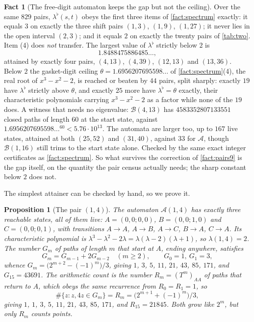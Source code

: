 \documentclass[11pt]{amsart}
\newtheorem{proposition}[theorem]{Proposition}
\theoremstyle{definition}
\newtheorem{fact}[theorem]{Fact}
\theoremstyle{remark}
\begin{document}
\begin{fact}[The free-digit automaton keeps the gap but not the ceiling]
\label{fact:freespectrum}
Over the same $829$ pairs, $\lambda^\flat(s,t)$ obeys the first three items of \cref{fact:spectrum} exactly: it equals $3$ on exactly the three shift pairs $(1,3)$, $(1,9)$, $(1,27)$; it never lies in the open interval $(2,3)$; and it equals $2$ on exactly the twenty pairs of \cref{tab:two}. Item (4) does \emph{not} transfer. The largest value of $\lambda^\flat$ strictly below $2$ is
\[
1.8488475886485\ldots ,
\]
attained by exactly four pairs, $(4,13)$, $(4,39)$, $(12,13)$ and $(13,36)$. Below $2$ the gasket-digit ceiling $\theta=1.6956207695598\ldots$ of \cref{fact:spectrum}(4), the real root of $x^3-x^2-2$, is reached or beaten by $44$ pairs, split sharply: exactly $19$ have $\lambda^\flat$ strictly above $\theta$, and exactly $25$ more have $\lambda^\flat=\theta$ exactly, their characteristic polynomials carrying $x^3-x^2-2$ as a factor while none of the $19$ does. A witness that needs no eigenvalue: $\mathcal{B}(4,13)$ has $4583352807133551$ closed paths of length $60$ at the start state, against $1.6956207695598\ldots^{60}<5.76\cdot 10^{13}$. The automata are larger too, up to $167$ live states, attained at both $(25,52)$ and $(31,40)$, against $33$ for $\mathcal{A}$, though $\mathcal{B}(1,16)$ still trims to the start state alone. Checked by the same exact integer certificates as \cref{fact:spectrum}. So what survives the correction of \cref{fact:pairs9} is the gap itself, on the quantity the pair census actually needs; the sharp constant below $2$ does not.
\end{fact}

The simplest attainer can be checked by hand, so we prove it.

\begin{proposition}[The pair $(1,4)$]
\label{prop:one4}
The automaton $\mathcal{A}(1,4)$ has exactly three reachable states, all of them live: $A=(0,0;0,0)$, $B=(0,0;1,0)$ and $C=(0,0;0,1)$, with transitions $A\to A$, $A\to B$, $A\to C$, $B\to A$, $C\to A$. Its characteristic polynomial is $\lambda^3-\lambda^2-2\lambda=\lambda(\lambda-2)(\lambda+1)$, so $\lambda(1,4)=2$. The number $G_m$ of paths of length $m$ that start at $A$, ending anywhere, satisfies
\[
G_m=G_{m-1}+2G_{m-2}\quad (m\ge 2), \qquad G_0=1,\ G_1=3,
\]
whence $G_m=\bigl(2^{m+2}-(-1)^m\bigr)/3$, giving $1$, $3$, $5$, $11$, $21$, $43$, $85$, $171$, and $G_{15}=43691$. The arithmetic count is the number $R_m=(T^m)_{AA}$ of paths that return to $A$, which obeys the same recurrence from $R_0=R_1=1$, so
\[
\#\{z: z, 4z\in G_m\}=R_m=\bigl(2^{m+1}+(-1)^m\bigr)/3 ,
\]
giving $1$, $1$, $3$, $5$, $11$, $21$, $43$, $85$, $171$, and $R_{15}=21845$. Both grow like $2^m$, but only $R_m$ counts points.
\end{proposition}
\end{document}
